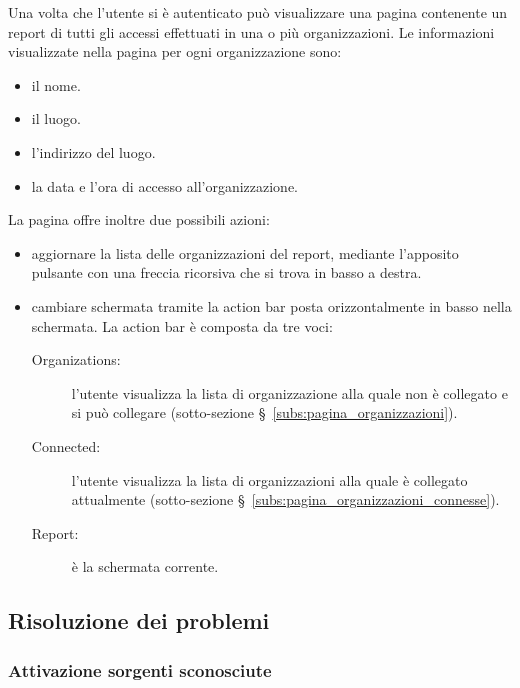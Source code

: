 \documentclass[../manuale-utente.tex]{subfiles}
\begin{document}
Una volta che l'utente si è autenticato può visualizzare una pagina contenente un report di tutti gli accessi effettuati in una o più organizzazioni.
Le informazioni visualizzate nella pagina per ogni organizzazione sono:
\begin{itemize}
    \item il nome.
    \item il luogo.
    \item l'indirizzo del luogo.
    \item la data e l'ora di accesso all'organizzazione.
\end{itemize}
La pagina offre inoltre due possibili azioni:
\begin{itemize}
  \item aggiornare la lista delle organizzazioni del report, mediante l'apposito pulsante con una freccia ricorsiva che si trova in basso a destra.
  \item cambiare schermata tramite la action bar posta orizzontalmente in basso nella schermata. La action bar è composta da tre voci:
  \begin{description}
    \item[Organizations:] l'utente visualizza la lista di organizzazione alla quale non è collegato e si può collegare (sotto-sezione §~\ref{subs:pagina_organizzazioni}).
    \item[Connected:] l'utente visualizza la lista di organizzazioni alla quale è collegato attualmente (sotto-sezione §~\ref{subs:pagina_organizzazioni_connesse}).
    \item[Report:] è la schermata corrente.
  \end{description}
\end{itemize}



\subsection{Risoluzione dei problemi}%
\label{subs:mobile_app_risoluzione_problemi}

\subsubsection{Attivazione sorgenti sconosciute}%
\label{subs:mobile_app_attivare_sorgenti_sconosciute}
\end{document}
